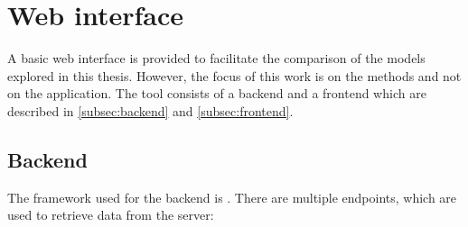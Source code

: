\section{Web interface}\label{sec:ui}

A basic web interface is provided to facilitate the comparison of the models explored in this thesis.
However, the focus of this work is on the methods and not on the application.
The tool consists of a backend and a frontend which are described in \autoref{subsec:backend} and \autoref{subsec:frontend}.

\subsection{Backend}\label{subsec:backend}

The framework used for the backend is \flask{}.
There are multiple endpoints, which are used to retrieve data from the server:


